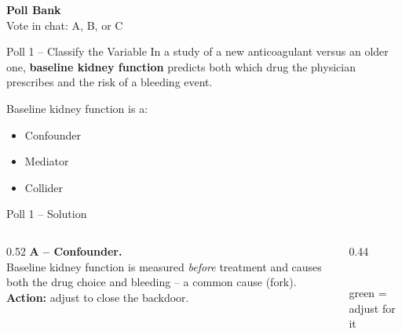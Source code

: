 \documentclass[aspectratio=169]{beamer}
\begin{document}

\begin{frame}[plain]
  \centering
  \vfill
  {\color{inkdark}\textbf{\Large Poll Bank}}\\[0.6em]
  {\normalsize Vote in chat: A, B, or C}
  \vfill
\end{frame}

\begin{frame}{Poll 1 \;--\; Classify the Variable}
  \small
  In a study of a new anticoagulant versus an older one, \textbf{baseline kidney
  function} predicts both which drug the physician prescribes and the risk of
  a bleeding event.
  \vspace{0.8em}

  Baseline kidney function is a:
  \begin{itemize}
    \item[\textbf{A.}] Confounder
    \item[\textbf{B.}] Mediator
    \item[\textbf{C.}] Collider
  \end{itemize}
\end{frame}

\begin{frame}{Poll 1 \;--\; Solution}
  \small
  \begin{columns}[T]
    \begin{column}{0.52\textwidth}
      \textcolor{good}{\textbf{A -- Confounder.}}\\[0.4em]
      Baseline kidney function is measured \emph{before} treatment and causes
      both the drug choice and bleeding -- a common cause (fork).\\[0.4em]
      \textcolor{accent}{\textbf{Action:}} adjust to close the backdoor.
    \end{column}
    \begin{column}{0.44\textwidth}
      \centering
      \\[0.3em]
      {\scriptsize\textcolor{good}{green = adjust for it}}
    \end{column}
  \end{columns}
\end{frame}
\end{document}
